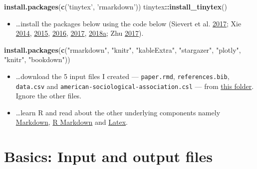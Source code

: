 \documentclass[
  12pt,
]{article}
\newenvironment{Shaded}{\begin{snugshade}}{\end{snugshade}}
\newcommand{\KeywordTok}[1]{\textcolor[rgb]{0.13,0.29,0.53}{\textbf{#1}}}
\newcommand{\NormalTok}[1]{#1}
\newcommand{\OperatorTok}[1]{\textcolor[rgb]{0.81,0.36,0.00}{\textbf{#1}}}
\newcommand{\StringTok}[1]{\textcolor[rgb]{0.31,0.60,0.02}{#1}}
\providecommand{\tightlist}{%
  \setlength{\itemsep}{0pt}\setlength{\parskip}{0pt}}
\begin{document}
\begin{Shaded}
\begin{Highlighting}[]
\KeywordTok{install.packages}\NormalTok{(}\KeywordTok{c}\NormalTok{(}\StringTok{'tinytex'}\NormalTok{, }\StringTok{'rmarkdown'}\NormalTok{))}
\NormalTok{tinytex}\OperatorTok{::}\KeywordTok{install_tinytex}\NormalTok{()}
\end{Highlighting}
\end{Shaded}

\begin{itemize}
\tightlist
\item
  \ldots install the packages below using the code below (Sievert et al. \protect\hyperlink{ref-plotly}{2017}; Xie \protect\hyperlink{ref-knitr3}{2014}, \protect\hyperlink{ref-knitr2}{2015}, \protect\hyperlink{ref-bookdown2}{2016}, \protect\hyperlink{ref-bookdown1}{2017}, \protect\hyperlink{ref-knitr1}{2018}\protect\hyperlink{ref-knitr1}{a}; Zhu \protect\hyperlink{ref-kableextra}{2017}).
\end{itemize}

\begin{Shaded}
\begin{Highlighting}[]
\KeywordTok{install.packages}\NormalTok{(}\KeywordTok{c}\NormalTok{(}\StringTok{"rmarkdown"}\NormalTok{, }\StringTok{"knitr"}\NormalTok{, }\StringTok{"kableExtra"}\NormalTok{,}
                   \StringTok{"stargazer"}\NormalTok{, }\StringTok{"plotly"}\NormalTok{, }\StringTok{"knitr"}\NormalTok{,}
                   \StringTok{"bookdown"}\NormalTok{))}
\end{Highlighting}
\end{Shaded}

\begin{itemize}
\item
  \ldots download the 5 input files I created --- \texttt{paper.rmd}, \texttt{references.bib}, \texttt{data.csv} and \texttt{american-sociological-association.csl} --- from \href{https://drive.google.com/drive/folders/1zJP3cNPrHN-gj0rcmbHQgg-XA0hqDXdd?usp=sharing}{this folder}. Ignore the other files.
\item
  \ldots learn R and read about the other underlying components namely \href{https://en.wikipedia.org/wiki/Markdown}{Markdown}, \href{https://rmarkdown.rstudio.com/lesson-1.html}{R Markdown} and \href{https://en.wikipedia.org/wiki/LaTeX}{Latex}.
\end{itemize}

\hypertarget{basics-input-and-output-files}{%
\section{Basics: Input and output files}\label{basics-input-and-output-files}}
\end{document}
